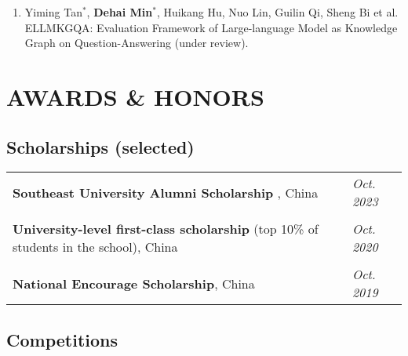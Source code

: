 \documentclass[a4paper,12pt]{article}
\begin{document}
\begin{enumerate}

\item Yiming Tan$^*$, \textbf{Dehai Min}$^*$, Huikang Hu, Nuo Lin, Guilin Qi, Sheng Bi et al. ELLMKGQA: Evaluation Framework of Large-language Model as Knowledge Graph on
Question-Answering (under review).

\end{enumerate}


\section{AWARDS \& HONORS}

\subsection*{Scholarships (selected)}

\begin{tabularx}{\linewidth}{@{}l X@{}}

\hspace{0.2cm} \textbf{Southeast University Alumni Scholarship} , China & \hfill \normalsize{\textit{Oct. 2023}}\\
\\
\hspace{0.2cm} \textbf{University-level first-class scholarship} (top 10\% of students in the school), China & \hfill \normalsize{\textit{Oct. 2020}}\\
\\
\hspace{0.2cm} \textbf{National Encourage Scholarship}, China & \hfill \normalsize{\textit{Oct. 2019}}\\
\end{tabularx}


\subsection*{Competitions}
\end{document}
